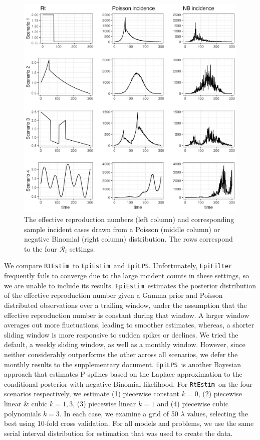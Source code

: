 \documentclass[10pt,letterpaper]{article}
\def\RtEstim{\texttt{RtEstim}}
\def\EpiEstim{\texttt{EpiEstim}}
\def\EpiLPS{\texttt{EpiLPS}}
\def\calR{\mathcal{R}}
\begin{document}
\begin{figure}[!h]
  \centering
  \includegraphics[width=.8\textwidth]{fig/plot_samples.png}
  \caption{The effective reproduction numbers (left column) and corresponding
  sample incident cases drawn from a  Poisson (middle column) or negative
  Binomial (right column) distribution. The rows correspond to the four
  $\calR_t$ settings.} 
  \label{fig:samples}
\end{figure}

We compare \RtEstim\ to \EpiEstim\ and \EpiLPS. Unfortunately,
\texttt{EpiFilter} frequently fails to converge due to the large incident counts
in these settings, so we are unable to include its results. \EpiEstim\ estimates
the posterior distribution of the effective reproduction number given a Gamma
prior and Poisson distributed observations
over a trailing window, under the assumption that the effective reproduction number is
constant during that window. A larger window averages out more
fluctuations,
leading to smoother estimates, whereas, a shorter sliding window is more
responsive to sudden spikes or declines. We tried the default, a weekly sliding
window, as well as a monthly window. However, since neither considerably
outperforms the other across all scenarios, we defer the monthly results to the
supplementary document. \EpiLPS\ is another Bayesian approach that estimates P-splines 
based on the Laplace approximation to the conditional posterior with negative
Binomial likelihood. For \RtEstim\ on the four scenarios respectively, we
estimate (1) piecewise constant $k=0$, (2) piecewise linear \& cubic $k=1,3$,
(3) piecewise linear $k=1$ and (4) piecewise cubic polynomials $k=3$. In each
case, we examine a grid of 50 $\lambda$ values, selecting the best using 10-fold
cross validation. For all models and problems, we use the same serial interval
distribution for estimation that was used to create the data. 
\end{document}
